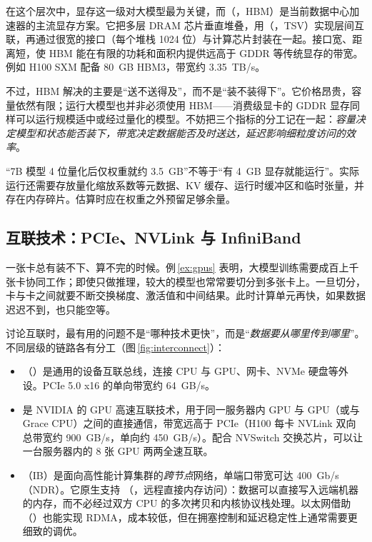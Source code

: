 

在这个层次中，显存这一级对大模型最为关键，而（，HBM）是当前数据中心加速器的主流显存方案。它把多层 DRAM 芯片垂直堆叠，用（，TSV）实现层间互联，再通过很宽的接口（每个堆栈 1024 位）与计算芯片封装在一起。接口宽、距离短，使 HBM 能在有限的功耗和面积内提供远高于 GDDR 等传统显存的带宽。例如 H100 SXM 配备 \SI{80}{GB} HBM3，带宽约 \SI{3.35}{TB/s}\cite{nvidia2023h100}。

不过，HBM 解决的主要是“送不送得及”，而不是“装不装得下”。它价格昂贵，容量依然有限；运行大模型也并非必须使用 HBM——消费级显卡的 GDDR 显存同样可以运行规模适中或经过量化的模型。不妨把三个指标的分工记在一起：\emph{容量决定模型和状态能否装下，带宽决定数据能否及时送达，延迟影响细粒度访问的效率}。

\begin{pitfall}
“7B 模型 4 位量化后仅权重就约 \SI{3.5}{GB}”不等于“有 \SI{4}{GB} 显存就能运行”。实际运行还需要存放量化缩放系数等元数据、KV 缓存、运行时缓冲区和临时张量，并存在内存碎片。估算时应在权重之外预留足够余量。
\end{pitfall}

\subsection{互联技术：PCIe、NVLink 与 InfiniBand}
\label{subsec:interconnect}

一张卡总有装不下、算不完的时候。例\,\ref{ex:gpus} 表明，大模型训练需要成百上千张卡协同工作；即使只做推理，较大的模型也常常要切分到多张卡上。一旦切分，卡与卡之间就要不断交换梯度、激活值和中间结果。此时计算单元再快，如果数据迟迟不到，也只能空等。

讨论互联时，最有用的问题不是“哪种技术更快”，而是“\emph{数据要从哪里传到哪里}”。不同层级的链路各有分工（图\,\ref{fig:interconnect}）：
\begin{itemize}
  \item {}（）是通用的设备互联总线，连接 CPU 与 GPU、网卡、NVMe 硬盘等外设。PCIe 5.0 x16 的单向带宽约 \SI{64}{GB/s}。
  \item {} 是 NVIDIA 的 GPU 高速互联技术，用于同一服务器内 GPU 与 GPU（或与 Grace CPU）之间的直接通信，带宽远高于 PCIe（H100 每卡 NVLink 双向总带宽约 \SI{900}{GB/s}，单向约 \SI{450}{GB/s}\cite{nvidia2023h100}）。配合 NVSwitch 交换芯片，可以让一台服务器内的 8 张 GPU 两两全速互联。
  \item {}（IB）是面向高性能计算集群的\emph{跨节点}网络，单端口带宽可达 \SI{400}{Gb/s}（NDR）。它原生支持 （，远程直接内存访问）：数据可以直接写入远端机器的内存，而不必经过双方 CPU 的多次拷贝和内核协议栈处理。以太网借助 （）也能实现 RDMA，成本较低，但在拥塞控制和延迟稳定性上通常需要更细致的调优。
\end{itemize}

